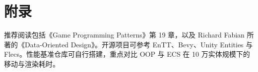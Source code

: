 \chapter{附录}
推荐阅读包括《Game Programming Patterns》第 19 章，以及 Richard Fabian 所著的《Data-Oriented Design》。开源项目可参考 EnTT、Bevy、Unity Entities 与 Flecs。性能基准仓库可自行搭建，重点对比 OOP 与 ECS 在 10 万实体规模下的移动与渲染耗时。\par
